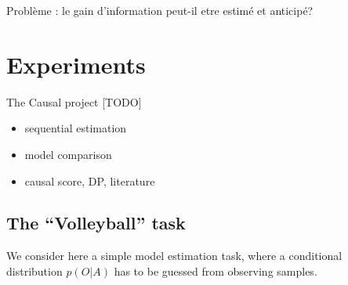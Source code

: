 \documentclass[10pt,letterpaper]{article}
\begin{document}

{\color{magenta} Problème : le gain d'information peut-il etre estimé et anticipé?}





\section{Experiments }

{\color{blue} The Causal project [TODO] 
\begin{itemize}
    \item sequential estimation
    \item model comparison
    \item causal score, DP, literature
\end{itemize}
}
\subsection{The ``Volleyball'' task}
We consider here a simple model estimation task, where a conditional distribution $p(O|A)$ %
has to be guessed from observing samples. %
\end{document}
